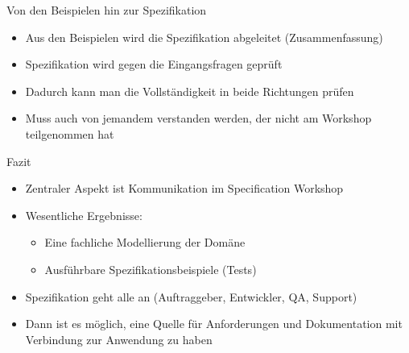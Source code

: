 \begin{frame}{Von den Beispielen hin zur Spezifikation}

\begin{itemize}
	\item Aus den Beispielen wird die Spezifikation abgeleitet (Zusammenfassung)
        \item Spezifikation wird gegen die Eingangsfragen geprüft
	\item Dadurch kann man die Vollständigkeit in beide Richtungen prüfen
	\item Muss auch von jemandem verstanden werden, der nicht am Workshop teilgenommen hat
\end{itemize}

\end{frame}
 

\begin{frame}{Fazit}

\begin{itemize}
	\item Zentraler Aspekt ist Kommunikation im Specification Workshop
	\item Wesentliche Ergebnisse:
	\begin{itemize}
		\item Eine fachliche Modellierung der Domäne
		\item Ausführbare Spezifikationsbeispiele (Tests)
	\end{itemize}
	\item Spezifikation geht alle an (Auftraggeber, Entwickler, QA, Support)
	\item Dann ist es möglich, eine Quelle für Anforderungen und Dokumentation mit Verbindung zur Anwendung zu haben
\end{itemize}

\end{frame}

